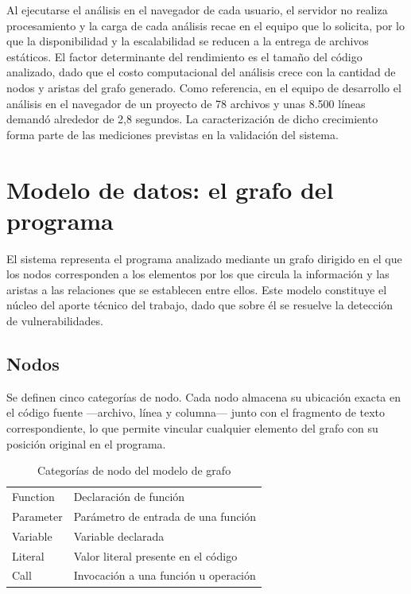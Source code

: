 Al ejecutarse el análisis en el navegador de cada usuario, el servidor no realiza procesamiento y la carga de cada análisis recae en el equipo que lo solicita, por lo que la disponibilidad y la escalabilidad se reducen a la entrega de archivos estáticos. El factor determinante del rendimiento es el tamaño del código analizado, dado que el costo computacional del análisis crece con la cantidad de nodos y aristas del grafo generado. Como referencia, en el equipo de desarrollo el análisis en el navegador de un proyecto de 78 archivos y unas 8.500 líneas demandó alrededor de 2,8 segundos. La caracterización de dicho crecimiento forma parte de las mediciones previstas en la validación del sistema.

\section{Modelo de datos: el grafo del programa}\label{sec:n4.5}

El sistema representa el programa analizado mediante un grafo dirigido en el que los nodos corresponden a los elementos por los que circula la información y las aristas a las relaciones que se establecen entre ellos. Este modelo constituye el núcleo del aporte técnico del trabajo, dado que sobre él se resuelve la detección de vulnerabilidades.

\subsection{Nodos}\label{sec:n4.5.1}

Se definen cinco categorías de nodo. Cada nodo almacena su ubicación exacta en el código fuente —archivo, línea y columna— junto con el fragmento de texto correspondiente, lo que permite vincular cualquier elemento del grafo con su posición original en el programa.

\begin{table}[H]
    \centering
    \caption{Categorías de nodo del modelo de grafo}
    \label{tab:nodos}
    \small
    \begin{tabularx}{\textwidth}{l L}
        \toprule
         &  \\
        \midrule
        Function & Declaración de función \\
        Parameter & Parámetro de entrada de una función \\
        Variable & Variable declarada \\
        Literal & Valor literal presente en el código \\
        Call & Invocación a una función u operación \\
        \bottomrule
    \end{tabularx}
\end{table}

